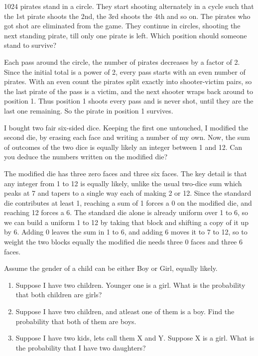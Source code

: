 \begin{problem}
1024 pirates stand in a circle. They start shooting alternately in a cycle such that the 1st pirate shoots the 2nd, the 3rd shoots the 4th and so on. The pirates who got shot are eliminated from the game. They continue in circles, shooting the next standing pirate, till only one pirate is left. Which position should someone stand to survive?
\end{problem}

\begin{solution}
Each pass around the circle, the number of pirates decreases by a factor of 2. Since the initial total is a power of 2, every pass starts with an even number of pirates. With an even count the pirates split exactly into shooter-victim pairs, so the last pirate of the pass is a victim, and the next shooter wraps back around to position 1. Thus position 1 shoots every pass and is never shot, until they are the last one remaining. So the pirate in position 1 survives.
\end{solution}


\begin{problem}
I bought two fair six-sided dice. Keeping the first one untouched, I modified the second die, by erasing each face and writing a number of my own. Now, the sum of outcomes of the two dice is equally likely an integer between 1 and 12. Can you deduce the numbers written on the modified die?
\end{problem}

\begin{solution}
The modified die has three zero faces and three six faces. The key detail is that any integer from 1 to 12 is equally likely, unlike the usual two-dice sum which peaks at 7 and tapers to a single way each of making 2 or 12. Since the standard die contributes at least 1, reaching a sum of 1 forces a 0 on the modified die, and reaching 12 forces a 6. The standard die alone is already uniform over 1 to 6, so we can build a uniform 1 to 12 by taking that block and shifting a copy of it up by 6. Adding 0 leaves the sum in 1 to 6, and adding 6 moves it to 7 to 12, so to weight the two blocks equally the modified die needs three 0 faces and three 6 faces.
\end{solution}

\begin{problem}
Assume the gender of a child can be either Boy or Girl, equally likely.

\begin{enumerate}[label={\alph*.}]
    \item Suppose I have two children. Younger one is a girl. What is the probability that both children are girls?
    \item Suppose I have two children, and atleast one of them is a boy. Find the probability that both of them are boys.
    \item Suppose I have two kids, lets call them X and Y. Suppose X is a girl. What is the probability that I have two daughters?
\end{enumerate}
\end{problem}

